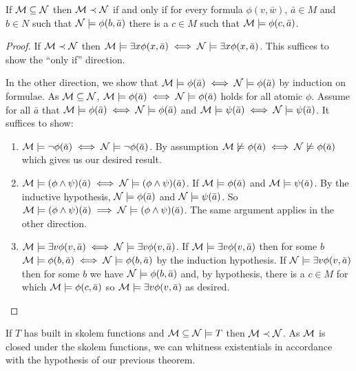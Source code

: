 \begin{theorem}\label{theorem_tarski_vaught_test}
If \(\mathcal{M} \subseteq \mathcal{N}\) then \(\mathcal{M} \prec \mathcal{N}\) if and only if for every formula \(\phi(v, \bar{w})\), \(\bar{a} \in M\) and \(b \in N\) such that \(\mathcal{N} \models \phi(b, \bar{a})\) there is a \(c \in M\) such that \(\mathcal{M} \models \phi(c, \bar{a})\).
\end{theorem}

\begin{proof}
If \(\mathcal{M} \prec \mathcal{N}\) then \(\mathcal{M} \models \exists x \phi(x, \bar{a}) \iff \mathcal{N} \models \exists x \phi(x, \bar{a})\). This suffices to show the ``only if'' direction.

In the other direction, we show that \(\mathcal{M} \models \phi(\bar{a}) \iff \mathcal{N} \models \phi(\bar{a})\) by induction on formulae. 
As \(\mathcal{M} \subseteq \mathcal{N}\), \(\mathcal{M} \models \phi(\bar{a}) \iff \mathcal{N} \models \phi(\bar{a})\) holds for all atomic \(\phi\).
Assume for all \(\bar{a}\) that  \(\mathcal{M} \models \phi(\bar{a}) \iff \mathcal{N} \models \phi(\bar{a})\) and \(\mathcal{M} \models \psi(\bar{a}) \iff \mathcal{N} \models \psi(\bar{a})\).
It suffices to show:
\begin{enumerate}
\item \(\mathcal{M} \models \neg \phi(\bar{a}) \iff \mathcal{N} \models \neg \phi(\bar{a})\). By assumption \(\mathcal{M} \not \models \phi(\bar{a}) \iff  \mathcal{N} \not \models \phi(\bar{a})\) which gives us our desired result. 
\item \(\mathcal{M} \models (\phi\land\psi)(\bar{a}) \iff \mathcal{N} \models (\phi\land\psi)(\bar{a})\). If \(\mathcal{M} \models \phi(\bar{a})\) and \(\mathcal{M} \models \psi(\bar{a})\). By the inductive hypothesis,  \(\mathcal{N} \models \phi(\bar{a})\) and \(\mathcal{N} \models \psi(\bar{a})\). So \(\mathcal{M} \models (\phi \land \psi)(\bar{a}) \implies \mathcal{N} \models (\phi \land \psi)(\bar{a})\). The same argument applies in the other direction. 
\item \(\mathcal{M} \models \exists v \phi(v, \bar{a}) \iff \mathcal{N} \models \exists v \phi(v, \bar{a})\). If \(\mathcal{M} \models \exists v \phi(v, \bar{a})\) then for some \(b\) \(\mathcal{M} \models \phi(b, \bar{a}) \iff \mathcal{N} \models \phi(b, \bar{a})\) by the induction hypothesis. If \(\mathcal{N} \models \exists v \phi(v, \bar{a})\) then for some \(b\) we have \(\mathcal{N} \models \phi(b, \bar{a})\) and, by hypothesis, there is a \(c \in M\) for which \(\mathcal{M} \models \phi(c, \bar{a})\) so \(\mathcal{M} \models \exists v \phi(v, \bar{a})\) as desired.    
\end{enumerate}
\end{proof}

\begin{cor}\label{closure_under_skolem_functions}
If \(T\) has built in skolem functions and \(\mathcal{M} \subseteq \mathcal{N} \models T\) then \(\mathcal{M} \prec \mathcal{N}\). 
As \(\mathcal{M}\) is closed under the skolem functions, we can whitness existentials in accordance with the hypothesis of our previous theorem. 
\end{cor}


